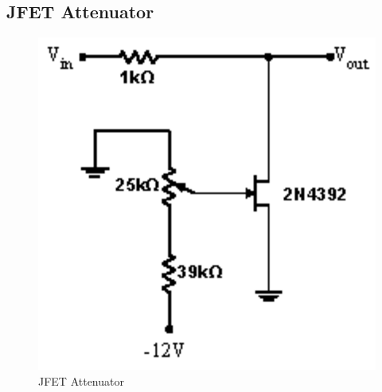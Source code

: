 \documentclass{article}
\begin{document}
\subsection{JFET Attenuator}
    \begin{figure}[H]
        \centering
        \includegraphics[scale = 0.6]{5_7.png}
        \caption{JFET Attenuator~\cite{webfig}}
        \label{fig:my_label}
    \end{figure}
\end{document}
